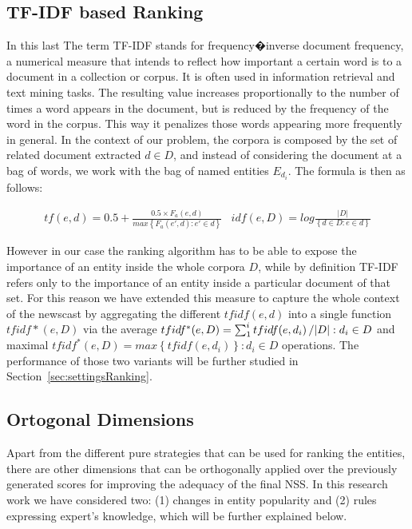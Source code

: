 \documentclass{llncs}
\begin{document}
\subsection{TF-IDF based Ranking}

In this last The term TF-IDF stands for frequency�inverse document frequency, a numerical measure that intends to reflect how important a certain word is to a document in a collection or corpus. It is often used in information retrieval and text mining tasks. The resulting value increases proportionally to the number of times a word appears in the document, but is reduced by the frequency of the word in the corpus. This way it penalizes those words appearing more frequently in general. In the context of our problem, the corpora is composed by the set of related document extracted $d \in D$, and instead of considering the document at a bag of words, we work with the bag of named entities $E_{d_i}$. The formula is then as follows:

\begin{equation}
\begin{matrix}
tf(e,d) = 0.5 + \frac{0.5\times F_{a}(e,d)}{max\left \{ F_{a}(e',d) : e' \in d\right \}}  & idf(e,D) = log\frac{\left | D \right |}{\left \{ d\in D  :  e\in d \right \}}
\end{matrix}
\end{equation}

However in our case the ranking algorithm has to be able to expose the importance of an entity inside the whole corpora $D$, while by definition TF-IDF refers only to the importance of an entity inside a particular document of that set. For this reason we have extended this measure to capture the whole context of the newscast by aggregating the different $tfidf(e,d)$ into a single function $tfidf*(e,D)$ via the average $tfidf^{*}(e,D)=\sum_{1}^{i}tfidf(e,d_{i})\left /| D \right |: d_{i} \in D$ and maximal $tfidf^{*}(e,D)=max \left \{ tfidf(e,d_{i}) \right \} : d_{i} \in D$ operations. The performance of those two variants will be further studied in Section~\ref{sec:settingsRanking}.


\subsection{Ortogonal Dimensions}

Apart from the different pure strategies that can be used for ranking the entities, there are other dimensions that can be orthogonally applied over the previously generated scores for improving the adequacy of the final NSS. In this research work we have considered two: (1) changes in entity popularity and (2) rules expressing expert's knowledge, which will be further explained below.
\end{document}
